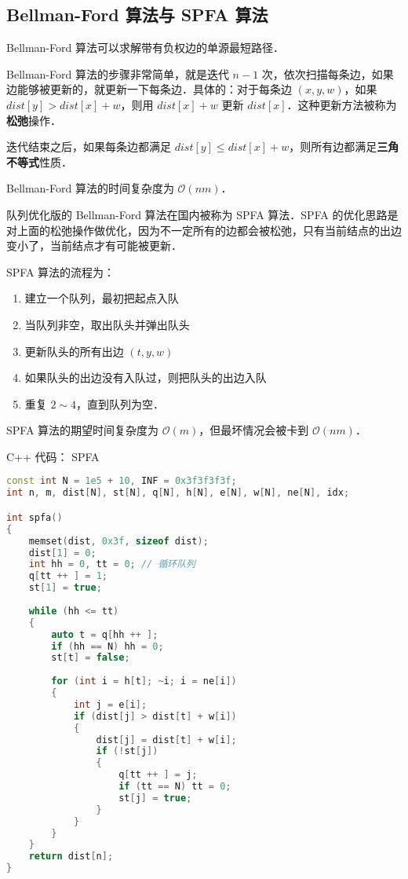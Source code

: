 \subsection{Bellman-Ford 算法与 SPFA 算法}

Bellman-Ford 算法可以求解带有负权边的单源最短路径．

Bellman-Ford 算法的步骤非常简单，就是迭代 $n - 1$ 次，依次扫描每条边，如果边能够被更新的，就更新一下每条边．具体的：对于每条边 $(x, y, w)$，如果 $dist[y] > dist[x] + w$，则用 $dist[x] + w$ 更新 $dist[x]$．这种更新方法被称为\textbf{松弛}操作．

迭代结束之后，如果每条边都满足 $dist[y] \leq dist[x] + w$，则所有边都满足\textbf{三角不等式}性质．

Bellman-Ford 算法的时间复杂度为 $\mathcal{O}(nm)$．

队列优化版的 Bellman-Ford 算法在国内被称为 SPFA 算法．SPFA 的优化思路是对上面的松弛操作做优化，因为不一定所有的边都会被松弛，只有当前结点的出边变小了，当前结点才有可能被更新．

SPFA 算法的流程为：

\begin{enumerate}
\item 建立一个队列，最初把起点入队
\item 当队列非空，取出队头并弹出队头
\item 更新队头的所有出边 $(t, y, w)$
\item 如果队头的出边没有入队过，则把队头的出边入队
\item 重复 $2 \sim 4$，直到队列为空．
\end{enumerate}

SPFA 算法的期望时间复杂度为 $\mathcal{O}(m)$，但最坏情况会被卡到 $\mathcal{O}(nm)$．

C++ 代码：
SPFA

\begin{lstlisting}[language=cpp]
const int N = 1e5 + 10, INF = 0x3f3f3f3f;
int n, m, dist[N], st[N], q[N], h[N], e[N], w[N], ne[N], idx;

int spfa()
{
    memset(dist, 0x3f, sizeof dist);
    dist[1] = 0;
    int hh = 0, tt = 0; // 循环队列
    q[tt ++ ] = 1;
    st[1] = true;
    
    while (hh <= tt)
    {
        auto t = q[hh ++ ];
        if (hh == N) hh = 0;
        st[t] = false;
        
        for (int i = h[t]; ~i; i = ne[i])
        {
            int j = e[i];
            if (dist[j] > dist[t] + w[i])
            {
                dist[j] = dist[t] + w[i];
                if (!st[j])
                {
                    q[tt ++ ] = j;
                    if (tt == N) tt = 0;
                    st[j] = true;
                }
            }
        }
    }
    return dist[n];
}
\end{lstlisting}

